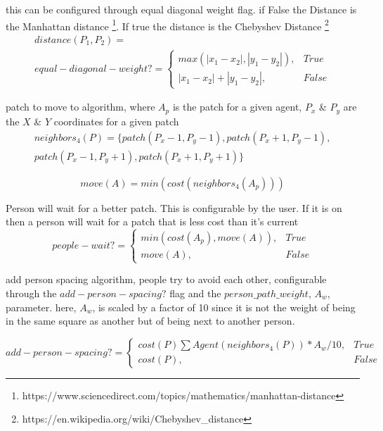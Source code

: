 \documentclass[12pt,letterpaper]{article}
\begin{document}
this can be configured through equal diagonal weight flag. if False the Distance is the Manhattan distance \footnote{ https://www.sciencedirect.com/topics/mathematics/manhattan-distance}. If true the distance is the Chebyshev Distance \footnote{https://en.wikipedia.org/wiki/Chebyshev\_distance}
\begin{align}
distance(P_1, P_2)  = \nonumber\\
equal-diagonal-weight?=
\begin{cases}
	max(|x_1-x_2|, |y_1-y_2|), & True \\
	|x_1-x_2|+ |y_1-y_2|, & False
\end{cases}
\end{align}


patch to move to algorithm, where $A_p$ is the patch for a given agent, $P_x$ \& $P_y$ are the $X$ \& $Y$ coordinates for a given patch
\begin{align}
neighbors_4 (P)  = \{patch(P_x - 1, P_y -1), patch(P_x + 1, P_y -1), \nonumber \\ 
patch(P_x - 1, P_y + 1),patch(P_x + 1, P_y + 1)\}   
\end{align}

\begin{equation}
move(A) = min(cost(neighbors_4 (A_p)))
\end{equation}

Person will wait for a better patch.  This is configurable by the user. If it is on then a person will wait for a patch that is less cost than it's current
\begin{equation}
people-wait?=
\begin{cases}
min(cost(A_p), move(A)), & True\\
move(A), & False
\end{cases}
\end{equation}

add person spacing algorithm, people try to avoid each other, configurable through the $add-person-spacing?$ flag and the $person\_path\_weight$, $A_w$, parameter.  here, $A_w$, is scaled by a factor of 10 since it is not the weight of being in the same square as another but of being next to another person.

\begin{equation}
add-person-spacing?=
\begin{cases}
	cost(P) \sum Agent(neighbors_4(P)) * A_w / 10, & True \\
	cost(P), & False
\end{cases}
\end{equation}
\end{document}
